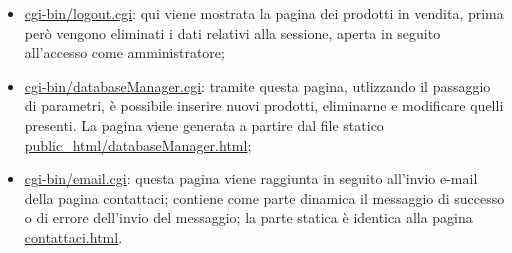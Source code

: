 {\begin{itemize}
		\item \href{http://tecnologie-web.studenti.math.unipd.it/tecweb/~pgabelli/cgi-bin/logout.cgi}{cgi-bin/logout.cgi}: qui viene mostrata la pagina dei prodotti in vendita, prima però vengono eliminati i dati relativi alla sessione, aperta in seguito all'accesso come amministratore;
		\item \href{http://tecnologie-web.studenti.math.unipd.it/tecweb/~pgabelli/cgi-bin/databaseManager.cgi}{cgi-bin/databaseManager.cgi}: tramite questa pagina, utlizzando il passaggio di parametri, è possibile inserire nuovi prodotti, eliminarne e modificare quelli presenti. La pagina viene generata a partire dal file statico \href{http://tecnologie-web.studenti.math.unipd.it/tecweb/~pgabelli/databaseManager.html}{public\_html/databaseManager.html};
		\item \href{http://tecnologie-web.studenti.math.unipd.it/tecweb/~pgabelli/cgi-bin/email.cgi}{cgi-bin/email.cgi}: questa pagina viene raggiunta in seguito all'invio e-mail della pagina contattaci; contiene come parte dinamica il messaggio di successo o di errore dell'invio del messaggio; la parte statica è identica alla pagina \href{http://tecnologie-web.studenti.math.unipd.it/tecweb/~pgabelli/contattaci.html}{contattaci.html}.
	\end{itemize}
}